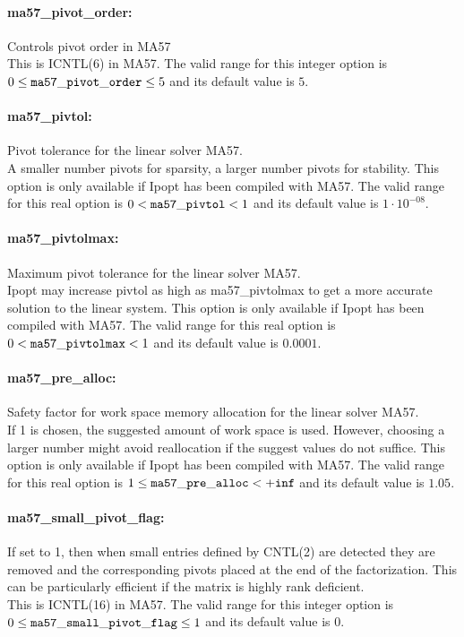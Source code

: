 \paragraph{ma57\_pivot\_order:}\label{opt:ma57_pivot_order} Controls pivot order in MA57 \\
 This is ICNTL(6) in MA57. The valid range for this integer option is
$0 \le {\tt ma57\_pivot\_order } \le 5$
and its default value is $5$.


\paragraph{ma57\_pivtol:}\label{opt:ma57_pivtol} Pivot tolerance for the linear solver MA57. \\
 A smaller number pivots for sparsity, a larger number pivots for stability. This option is only available if Ipopt has been compiled with MA57. The valid range for this real option is 
$0 <  {\tt ma57\_pivtol } <  1$
and its default value is $1 \cdot 10^{-08}$.


\paragraph{ma57\_pivtolmax:}\label{opt:ma57_pivtolmax} Maximum pivot tolerance for the linear solver MA57. \\
 Ipopt may increase pivtol as high as ma57\_pivtolmax to get a more accurate solution to the linear system.  This option is only available if Ipopt has been compiled with MA57. The valid range for this real option is 
$0 <  {\tt ma57\_pivtolmax } <  1$
and its default value is $0.0001$.


\paragraph{ma57\_pre\_alloc:}\label{opt:ma57_pre_alloc} Safety factor for work space memory allocation for the linear solver MA57. \\
 If 1 is chosen, the suggested amount of work space is used.  However, choosing a larger number might avoid reallocation if the suggest values do not suffice.  This option is only available if Ipopt has been compiled with MA57. The valid range for this real option is 
$1 \le {\tt ma57\_pre\_alloc } <  {\tt +inf}$
and its default value is $1.05$.


\paragraph{ma57\_small\_pivot\_flag:}\label{opt:ma57_small_pivot_flag} If set to 1, then when small entries defined by CNTL(2) are detected they are removed and the corresponding pivots placed at the end of the factorization.  This can be particularly efficient if the matrix is highly rank deficient. \\
 This is ICNTL(16) in MA57. The valid range for this integer option is
$0 \le {\tt ma57\_small\_pivot\_flag } \le 1$
and its default value is $0$.


